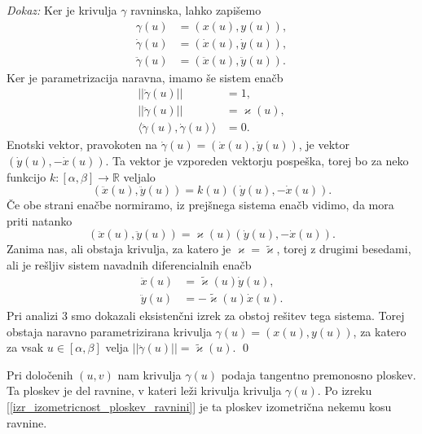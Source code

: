 {\em Dokaz:\/}
 Ker je krivulja $\gamma$ ravninska, lahko zapišemo 
 \begin{align*}
     \gamma(u) &= (x(u), y(u)), \\
     \dot{\gamma}(u) &= (\dot{x}(u), \dot{y}(u)), \\ 
     \ddot{\gamma}(u) &= (\ddot{x}(u), \ddot{y}(u)).
 \end{align*}
 Ker je parametrizacija naravna, imamo še sistem enačb
 \begin{align*}
  \lvert\lvert \dot{\gamma}(u) \rvert\rvert &= 1,   \\
  \lvert\lvert \ddot{\gamma}(u) \rvert\rvert &= \varkappa(u) ,   \\
    \langle \ddot{\gamma}(u), \dot{\gamma}(u) \rangle   &= 0.
 \end{align*}
 Enotski vektor, pravokoten na $\dot{\gamma}(u) = (\dot{x}(u), \dot{y}(u))$, je vektor $(\dot{y}(u), -\dot{x}(u))$. Ta vektor je vzporeden vektorju pospeška,
 torej bo za neko funkcijo $k : [\alpha, \beta]  \to \mathbb{R}$ veljalo 
 \begin{equation*} (\ddot{x}(u), \ddot{y}(u)) = k(u) (\dot{y}(u), -\dot{x}(u)). \end{equation*}Če obe strani enačbe normiramo, iz prejšnega sistema enačb vidimo, da mora priti natanko 
 \begin{equation*} (\ddot{x}(u), \ddot{y}(u)) = \varkappa(u) (\dot{y}(u), -\dot{x}(u)).\end{equation*}Zanima nas, ali obstaja krivulja, za katero je $\varkappa = \tilde{\varkappa}$, torej z drugimi besedami, ali je rešljiv sistem navadnih diferencialnih enačb 
 \begin{align*}
     \ddot{x}(u) &= \tilde{\varkappa}(u) \dot{y}(u), \\
     \ddot{y}(u) &= -\tilde{\varkappa}(u) \dot{x}(u).
 \end{align*}
Pri analizi 3 smo dokazali eksistenčni izrek za obstoj rešitev tega sistema. Torej obstaja
naravno parametrizirana krivulja $\gamma(u) = (x(u), y(u))$, za katero za vsak $u \in [\alpha, \beta]$ velja $\lvert\lvert \ddot{\gamma}(u) \rvert\rvert = \tilde{\varkappa}(u)$.
\qed

\begin{opomba}
 Pri določenih $(u,v)$ nam krivulja $\gamma(u)$ podaja tangentno premonosno ploskev. Ta ploskev je del ravnine, v kateri
 leži krivulja krivulja $\gamma(u)$. Po izreku [\ref{izr_izometricnost_ploskev_ravnini}] je ta ploskev izometrična nekemu kosu ravnine.
\end{opomba}

